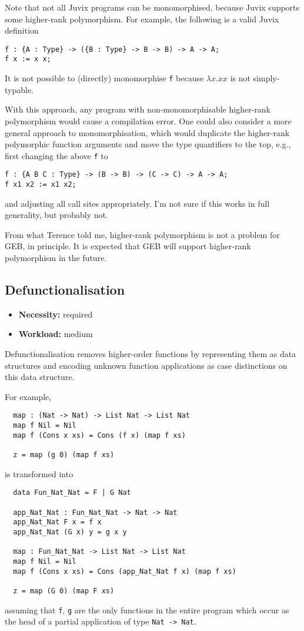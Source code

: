 \medskip

Note that not all Juvix programs can be monomorphised, because Juvix
supports some higher-rank polymorphism. For example, the following is
a valid Juvix definition
\begin{verbatim}
f : {A : Type} -> ({B : Type} -> B -> B) -> A -> A;
f x := x x;
\end{verbatim}
It is not possible to (directly) monomorphise \texttt{f} because
$\lambda x . x x$ is not simply-typable.

With this approach, any program with non-monomorphisable higher-rank
polymorphism would cause a compilation error. One could also consider
a more general approach to monomorphisation, which would duplicate the
higher-rank polymorphic function arguments and move the type
quantifiers to the top, e.g., first changing the above \texttt{f} to
\begin{verbatim}
f : {A B C : Type} -> (B -> B) -> (C -> C) -> A -> A;
f x1 x2 := x1 x2;
\end{verbatim}
and adjusting all call sites appropriately. I'm not sure if this works
in full generality, but probably not.

From what Terence told me, higher-rank polymorphism is not a problem
for GEB, in principle. It is expected that GEB will support
higher-rank polymorphism in the future.

\subsection{Defunctionalisation}\label{sec_defunctionalisation}

\begin{itemize}
\item {\bf Necessity:} required
\item {\bf Workload:} medium
\end{itemize}

\noindent Defunctionalisation removes higher-order functions by
representing them as data structures and encoding unknown function
applications as case distinctions on this data structure.

\medskip

\noindent For example,
\begin{verbatim}
  map : (Nat -> Nat) -> List Nat -> List Nat
  map f Nil = Nil
  map f (Cons x xs) = Cons (f x) (map f xs)

  z = map (g 0) (map f xs)
\end{verbatim}
is transformed into
\begin{verbatim}
  data Fun_Nat_Nat = F | G Nat

  app_Nat_Nat : Fun_Nat_Nat -> Nat -> Nat
  app_Nat_Nat F x = f x
  app_Nat_Nat (G x) y = g x y

  map : Fun_Nat_Nat -> List Nat -> List Nat
  map f Nil = Nil
  map f (Cons x xs) = Cons (app_Nat_Nat f x) (map f xs)

  z = map (G 0) (map F xs)
\end{verbatim}
assuming that \texttt{f}, \texttt{g} are the only functions in the
entire program which occur as the head of a partial application of
type \texttt{Nat -> Nat}.

